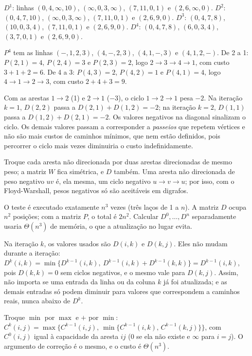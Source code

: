  $D^1$: linhas $(0,4,\infty,10)$, $(\infty,0,3,\infty)$, $(7,11,0,1)$ e $(2,6,\infty,0)$. $D^2$: $(0,4,7,10)$, $(\infty,0,3,\infty)$, $(7,11,0,1)$ e $(2,6,9,0)$. $D^3$: $(0,4,7,8)$, $(10,0,3,4)$, $(7,11,0,1)$ e $(2,6,9,0)$. $D^4$: $(0,4,7,8)$, $(6,0,3,4)$, $(3,7,0,1)$ e $(2,6,9,0)$.

 $P^4$ tem as linhas $(-,1,2,3)$, $(4,-,2,3)$, $(4,1,-,3)$ e $(4,1,2,-)$. De 2 a 1: $P(2,1)=4$, $P(2,4)=3$ e $P(2,3)=2$, logo $2\to3\to4\to1$, com custo $3+1+2=6$. De 4 a 3: $P(4,3)=2$, $P(4,2)=1$ e $P(4,1)=4$, logo $4\to1\to2\to3$, com custo $2+4+3=9$.

 Com as arestas $1\to2$ (1) e $2\to1$ ($-3$), o ciclo $1\to2\to1$ pesa $-2$. Na iteração $k=1$, $D(2,2)$ passa a $D(2,1)+D(1,2)=-2$; na iteração $k=2$, $D(1,1)$ passa a $D(1,2)+D(2,1)=-2$. Os valores negativos na diagonal sinalizam o ciclo. Os demais valores passam a corresponder a \emph{passeios} que repetem vértices e não são mais custos de caminhos mínimos, que nem estão definidos, pois percorrer o ciclo mais vezes diminuiria o custo indefinidamente.

 Troque cada aresta não direcionada por duas arestas direcionadas de mesmo peso; a matriz $W$ fica simétrica, e $D$ também. Uma aresta não direcionada de peso negativo $uv$ é, ela mesma, um ciclo negativo $u\to v\to u$; por isso, com o Floyd-Warshall, pesos negativos só são aceitáveis em digrafos.

 O teste é executado exatamente $n^3$ vezes (três laços de 1 a $n$). A matriz $D$ ocupa $n^2$ posições; com a matriz $P$, o total é $2n^2$. Calcular $D^0,\dots,D^n$ separadamente usaria $\Theta(n^3)$ de memória, o que a atualização no lugar evita.

 Na iteração $k$, os valores usados são $D(i,k)$ e $D(k,j)$. Eles não mudam durante a iteração: $D^k(i,k)=\min\{D^{k-1}(i,k),\ D^{k-1}(i,k)+D^{k-1}(k,k)\}=D^{k-1}(i,k)$, pois $D(k,k)=0$ sem ciclos negativos, e o mesmo vale para $D(k,j)$. Assim, não importa se uma entrada da linha ou da coluna $k$ já foi atualizada; e as demais entradas só podem diminuir para valores que correspondem a caminhos reais, nunca abaixo de $D^k$.

 Troque $\min$ por $\max$ e $+$ por $\min$: $C^k(i,j)=\max\{C^{k-1}(i,j),\ \min\{C^{k-1}(i,k),\,C^{k-1}(k,j)\}\}$, com $C^0(i,j)$ igual à capacidade da aresta $ij$ (0 se ela não existe e $\infty$ para $i=j$). O argumento de correção é o mesmo, e o custo é $\Theta(n^3)$.


